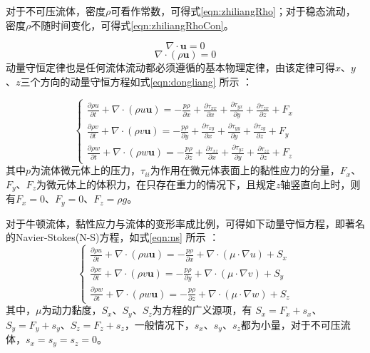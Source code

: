 对于不可压流体，密度$\rho$可看作常数，可得式\ref{eqn:zhiliangRho}；对于稳态流动，密度$\rho$不随时间变化，可得式\ref{eqn:zhiliangRhoCon}。

	\begin{equation}
		\label{eqn:zhiliangRho}
		\nabla \cdot \mathbf{u} =0
	\end{equation}
	\begin{equation}
		\label{eqn:zhiliangRhoCon}
		\nabla \cdot (\rho \mathbf{u}) =0
	\end{equation}
动量守恒定律也是任何流体流动都必须遵循的基本物理定律，由该定律可得$x$、$y$、$z$三个方向的动量守恒方程如式\ref{eqn:dongliang} 所示\supercite{ComsolCfd2015,WangFujun2004} ：

	\begin{equation}
		\label{eqn:dongliang}
		\left\{
		\begin{aligned}
		\frac{\partial \rho u}{\partial t}+\nabla \cdot (\rho u \mathbf{u}) = - \frac{p \rho}{\partial x}+\frac{\partial \tau_{xx}}{\partial x}+\frac{\partial \tau_{yx}}{\partial y}+\frac{\partial \tau_{zx}}{\partial z} + F_x \\
		\frac{\partial \rho v}{\partial t}+\nabla \cdot (\rho v \mathbf{u}) = - \frac{p \rho}{\partial y}+\frac{\partial \tau_{xy}}{\partial x}+\frac{\partial \tau_{yy}}{\partial y}+\frac{\partial \tau_{zy}}{\partial z} + F_y \\
		\frac{\partial \rho w}{\partial t}+\nabla \cdot (\rho w \mathbf{u}) = - \frac{p \rho}{\partial z}+\frac{\partial \tau_{xz}}{\partial x}+\frac{\partial \tau_{yz}}{\partial y}+\frac{\partial \tau_{zz}}{\partial z} + F_z 
		\end{aligned}
		\right.
	\end{equation}
其中$p$为流体微元体上的压力，$\tau_{ii}$为作用在微元体表面上的黏性应力的分量，$F_x$、$F_y$、$F_z$为微元体上的体积力，在只存在重力的情况下，且规定$z$轴竖直向上时，则有$F_x=0$、$F_y=0$、$F_z=\rho g$。

对于牛顿流体，黏性应力与流体的变形率成比例，可得如下动量守恒方程，即著名的Navier-Stokes(N-S)方程，如式\ref{eqn:ns} 所示\supercite{WangFujun2004} ：
	\begin{equation}
		\label{eqn:ns}
		\left\{
		\begin{aligned}
		\frac{\partial \rho u}{\partial t}+\nabla \cdot (\rho u \mathbf{u}) =- \frac{p \rho}{\partial x}+\nabla \cdot (\mu \cdot \nabla u ) + S_x \\
		\frac{\partial \rho v}{\partial t}+\nabla \cdot (\rho v \mathbf{u}) =- \frac{p \rho}{\partial y}+\nabla \cdot (\mu \cdot \nabla v ) + S_y \\
		\frac{\partial \rho w}{\partial t}+\nabla \cdot (\rho w \mathbf{u}) =- \frac{p \rho}{\partial z}+\nabla \cdot (\mu \cdot \nabla w ) + S_z 
		\end{aligned}
		\right.
	\end{equation}
其中，$\mu$为动力黏度，$S_x$、$S_y$、$S_z$为方程的广义源项，有 $S_x=F_x+s_x$、$S_y=F_y+s_y$、$S_z=F_z+s_z$，一般情况下，$s_x$、$s_y$、$s_z$都为小量，对于不可压流体，$s_x=s_y=s_z=0$。


